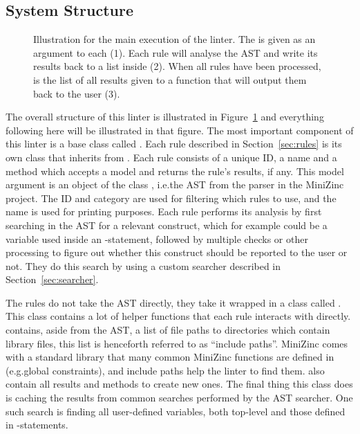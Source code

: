 \documentclass[a4paper,12pt]{article}
\begin{document}
\subsection{System Structure}\label{sec:impl:structure}
\begin{figure}[ht]
  \centering
  \smallskip%
  
  \smallskip%
  \caption{Illustration for the main execution of the linter. The  is given as
    an argument to each  (1). Each rule will analyse the AST and write its
    results back to a list inside  (2). When all rules have been processed, is
    the list of all results given to a function that will output them back to the user
    (3).}%
  \label{fig:overview}
\end{figure}

The overall structure of this linter is illustrated in Figure~\ref{fig:overview} and
everything following here will be illustrated in that figure. The most important component
of this linter is a base class called . Each rule described in
Section~\ref{sec:rules} is its own class that inherits from . Each rule
consists of a unique ID, %
a name and a method which accepts a model and returns the rule's results, if any.
This model argument is an object of the class , i.e.\@ the AST from the parser
in the MiniZinc project.
The ID and category are used for filtering which rules to use, and the name is used
for printing purposes. Each rule performs its analysis by first searching in the AST for a
relevant construct, which for example could be a variable used inside an
-statement, followed by multiple checks or other processing to figure out whether
this construct should be reported to the user or not. They do this search by using a
custom searcher described in Section~\ref{sec:searcher}.

\begin{sloppypar}
The rules do not take the AST directly, they take it wrapped in a class called
. This class contains a lot of helper functions that each rule interacts with
directly.  contains, aside from the AST, a list of file paths
to directories which contain library files, this list is henceforth referred to as
``include paths''.
MiniZinc comes with a standard library that many
common MiniZinc functions are defined in (e.g.\@ global constraints), and include paths help the linter to find them.
 also contain all results and methods to create new ones. The final thing
this class does is caching the results from common searches performed by the AST searcher.
One such search is finding all user-defined
variables, both top-level and those defined in -statements.
\end{sloppypar}
\end{document}
